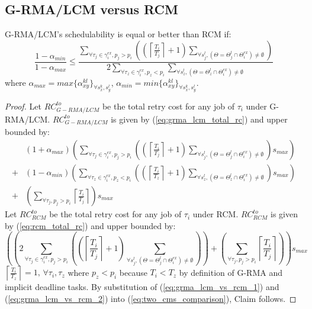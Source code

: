 \subsection{G-RMA/LCM versus RCM}\label{subsec:grma_lcm_vs_ecm}
%
\begin{clm}\label{rma_eval_clm}
G-RMA/LCM's schedulability is equal or better than RCM if:
%
\begin{equation}
\frac{1-\alpha_{min}}{1-\alpha_{max}}
\le
\frac{\sum_{\forall\tau_{j}\in\gamma_{i}^{ex},p_{j}>p_{i}}\left(\left(\left\lceil \frac{T_{i}}{T_{j}}\right\rceil +1\right)\sum_{\forall s_{j}^{l},\left(\Theta=\Theta_{j}^{l}\cap\Theta_{i}^{ex}\right)\neq\emptyset}\right)}{2\sum_{\forall\tau_{z}\in\gamma_{i}^{ex},p_{z}<p_{i}}\sum_{\forall s_{z}^{l},\left(\Theta=\Theta_{z}^{l}\cap\Theta_{i}^{ex}\right)\neq\emptyset}}
\label{eq70}
\end{equation}
%
where $\alpha_{max}=max\{\alpha_{xy}^{kl}\}_{\forall s_x^k,s_y^l}$, $\alpha_{min}=min\{\alpha_{xy}^{kl}\}_{\forall s_x^k,s_y^l}$.
\end{clm}
%
\begin{proof}\normalfont
%
Let $RC_{G-RMA/LCM}^{to}$ be the total retry cost for any job of $\tau_i$ under G-RMA/LCM. $RC_{G-RMA/LCM}^{to}$ is given by (\ref{eq:grma_lcm_total_rc}) and upper bounded by:
%
\begin{eqnarray}
 & \left(1+\alpha_{max}\right)\left(\sum_{\forall\tau_{j}\in\gamma_{i}^{ex},p_{j}>p_{i}}\left(\left(\left\lceil \frac{T_{i}}{T_{j}}\right\rceil +1\right)\sum_{\forall s_{j}^{l},\left(\Theta=\Theta_{j}^{l}\cap\Theta_{i}^{ex}\right)\neq\emptyset}\right)s_{max}\right)\nonumber\\
+ & \left(1-\alpha_{min}\right)\left(\sum_{\forall\tau_{z}\in\gamma_{i}^{ex},p_{z}<p_{i}}\left(\left(\left\lceil \frac{T_{i}}{T_{z}}\right\rceil +1\right)\sum_{\forall s_{z}^{l},\left(\Theta=\Theta_{z}^{l}\cap\Theta_{i}^{ex}\right)\neq\emptyset}\right)s_{max}\right)\nonumber\\
+ & \left(\sum_{\forall\tau_{j},p_{j}>p_{i}}\left\lceil \frac{T_{i}}{T_{j}}\right\rceil \right)s_{max}
\label{eq:grma_lcm_vs_rcm_1}
\end{eqnarray}
%
Let $RC_{RCM}^{to}$ be the total retry cost for any job of $\tau_i$ under RCM. $RC_{RCM}^{to}$ is given by (\ref{eq:rcm_total_rc}) and upper bounded by:
%
\begin{equation}
\left(\left(2\sum_{\forall\tau_{j}\in\gamma_{i}^{ex},p_{j}>p_{i}}\left(\left(\left\lceil \frac{T_{i}}{T_{j}}\right\rceil +1\right)\sum_{\forall s_{j}^{l},\left(\Theta=\Theta_{j}^{l}\cap\Theta_{i}^{ex}\right)\neq\emptyset}\right)\right)+\left(\sum_{\forall\tau_{j},p_{j}>p_{i}}\left\lceil \frac{T_{i}}{T_{j}}\right\rceil \right)\right)s_{max}
\label{eq:grma_lcm_vs_rcm_2}
\end{equation}
%
$\left\lceil \frac{T_{i}}{T_{z}}\right\rceil =1,\,\forall\tau_{i},\tau_{z}$ where $p_{z}<p_{i}$ because $T_{i}<T_{z}$ by definition of G-RMA and implicit deadline tasks. By substitution of (\ref{eq:grma_lcm_vs_rcm_1}) and (\ref{eq:grma_lcm_vs_rcm_2}) into (\ref{eq:two_cms_comparison}), Claim follows.
%
\end{proof}
%
